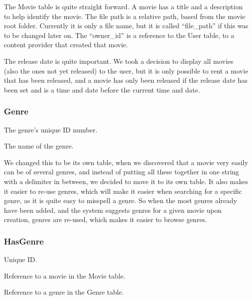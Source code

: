 The Movie table is quite straight forward. A movie has a title and a description to help identify the movie. The file path is a relative path, based from the movie root folder. Currently it is only a file name, but it is called ``file\_path'' if this was to be changed later on. The ``owner\_id'' is a reference to the User table, to a content provider that created that movie.

The release date is quite important. We took a decision to display all movies (also the ones not yet released) to the user, but it is only possible to rent a movie that has been released, and a movie has only been released if the release date has been set and is a time and date before the current time and date.

\subsubsection{Genre}
\label{Design_Database_Tables_Genre}

\begin{description}\addtolength{\itemsep}{-7pt}
\item[genre\_id] The genre's unique ID number.
\item[name] The name of the genre.
\end{description}

We changed this to be its own table, when we discovered that a movie very easily can be of several genres, and instead of putting all these together in one string with a delimiter in between, we decided to move it to its own table. It also makes it easier to re-use genres, which will make it easier when searching for a specific genre, as it is quite easy to misspell a genre. So when the most genres already have been added, and the system suggests genres for a given movie upon creation, genres are re-used, which makes it easier to browse genres.

\subsubsection{HasGenre}
\label{Design_Database_Tables_HasGenre}

\begin{description}\addtolength{\itemsep}{-7pt}
\item[hasgenre\_id] Unique ID.
\item[movie\_id] Reference to a movie in the Movie table.
\item[genre\_id] Reference to a genre in the Genre table.
\end{description}

